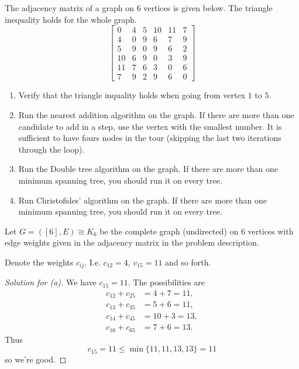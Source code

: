\documentclass[11pt]{article}
\begin{document}
\begin{prob*}[2, Problem 6]
    The adjacency matrix of a graph on $6$ vertices 
    is given below. The triangle inequality holds for the 
    whole graph. 
    \[
        \begin{bmatrix}
            0 & 4 & 5 &10&11& 7 \\ 
            4 & 0 & 9 & 6& 7& 9 \\ 
            5 & 9 & 0 & 9& 6& 2 \\ 
           10 & 6 & 9 & 0& 3& 9 \\ 
           11 & 7 & 6 & 3& 0& 6 \\ 
            7 & 9 & 2 & 9& 6& 0 
        \end{bmatrix}
    \]
    \begin{enumerate}[label=\alph*)]
        \item Verify that the triangle inquality 
            holds when going from vertex $1$ to $5$. 
        \item Run the nearest addition algorithm on 
            the graph. If there are more than 
            one candidate to add in a step, use the vertex 
            with the smallest number. It is sufficient to 
            have fours nodes in the tour (skipping the 
            last two iterations through the loop).
        \item Run the Double tree algorithm on the graph. 
            If there are more than one minimum spanning 
            tree, you should run it on every tree. 
        \item Run Christofides' algorithm on the graph. 
            If there are more than one minimum spanning 
            tree, you should run it on every tree. 
    \end{enumerate}
\end{prob*}

Let $G = ([6], E) \cong K_6$ be the complete 
graph (undirected) on $6$ vertices with edge weights given 
in the adjacency matrix in the problem description.

Denote the weights $c_{ij}$. I.e. 
$c_{12} = 4, \ c_{15} = 11$ and so forth. 

\begin{proof}[Solution for (a)]
    We have $c_{15} = 11$. 
    The possibilities are 
    \[
        \begin{aligned}
        c_{12}+c_{25}&=4+7=11,\\
        c_{13}+c_{35}&=5+6=11,\\
        c_{14}+c_{45}&=10+3=13,\\
        c_{16}+c_{65}&=7+6=13.
        \end{aligned}
    \]
    Thus 
    \[
        c_{15} = 11 \leq \min\{11,11,13,13\} = 11 
    \]
    so we're good.
\end{proof}
\end{document}
